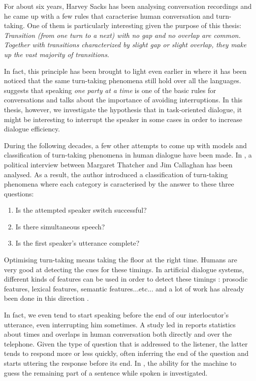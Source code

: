         For about six years, Harvey Sacks has been analysing conversation recordings and he came up with a few rules that caracterise human conversation and turn-taking. One of them is particularly interesting given the purpose of this thesis: \textit{Transition (from one turn to a next) with no gap and no overlap are common. Together with transitions characterized by slight gap or slight overlap, they make up the vast majority of transitions}.
				
				In fact, this principle has been brought to light even earlier in \cite{Sullivan1947} where it has been noticed that the same turn-taking phenomena still hold over all the languages. \cite{Schegloff1968} suggests that speaking \textit{one party at a time} is one of the basic rules for conversations and \cite{Jaffe1970} talks about the importance of avoiding interruptions. In this thesis, however, we investigate the hypothesis that in task-oriented dialogue, it might be interesting to interrupt the speaker in some cases in order to increase dialogue efficiency.
				
				During the following decades, a few other attempts to come up with models and classification of turn-taking phenomena in human dialogue have been made. In \cite{Beattie1982}, a political interview between Margaret Thatcher and Jim Callaghan has been analysed. As a result, the author introduced a classification of turn-taking phenomena where each category is caracterised by the answer to these three questions:
        
        \begin{enumerate}
            \item Is the attempted speaker switch successful?
            \item Is there simultaneous speech?
            \item Is the first speaker's utterance complete?
        \end{enumerate}
        
        Optimising turn-taking means taking the floor at the right time. Humans are very good at detecting the cues for these timings. In artificial dialogue systems, different kinds of features can be used in order to detect these timings \cite{Gravano2011}: prosodic features, lexical features, semantic features...etc... and a lot of work has already been done in this direction \cite{Raux2008,Jonsdottir2008,Meena2013}.

        In fact, we even tend to start speaking before the end of our interlocutor's utterance, even interrupting him sometimes. A study led in \cite{Strombergsson2013} reports statistics about times and overlaps in human conversation both directly and over the telephone. Given the type of question that is addressed to the listener, the latter tends to respond more or less quickly, often inferring the end of the question and starts uttering the response before its end. In \cite{DeVault2011}, the ability for the machine to guess the remaining part of a sentence while spoken is investigated.
				
